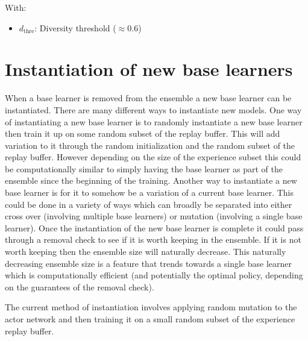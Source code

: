 With:
\begin{itemize}
    \item $d_{\text{thre}}$: Diversity threshold ($\approx 0.6$)
\end{itemize}



\section{Instantiation of new base learners}
\label{sec:instantiation}

When a base learner is removed from the ensemble a new base learner can be instantiated. There are many different ways to instantiate new models. One way of instantiating a new base learner is to randomly instantiate a new base learner then train it up on some random subset of the replay buffer. This will add variation to it through the random initialization and the random subset of the replay buffer. However depending on the size of the experience subset this could be computationally similar to simply having the base learner as part of the ensemble since the beginning of the training. Another way to instantiate a new base learner is for it to somehow be a variation of a current base learner. This could be done in a variety of ways which can broadly be separated into either cross over (involving multiple base learners) or mutation (involving a single base learner). Once the instantiation of the new base learner is complete it could pass through a removal check to see if it is worth keeping in the ensemble. If it is not worth keeping then the ensemble size will naturally decrease. This naturally decreasing ensemble size is a feature that trends towards a single base learner which is computationally efficient (and potentially the optimal policy, depending on the guarantees of the removal check).

The current method of instantiation involves applying random mutation to the actor network and then training it on a small random subset of the experience replay buffer.

